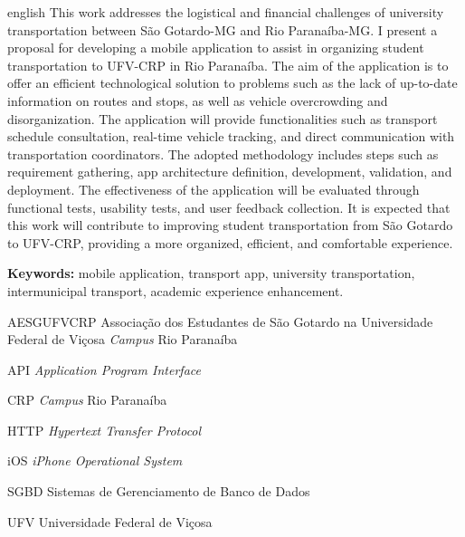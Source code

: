 \documentclass[
    12pt,                   %
    openright,              %
    oneside,                %
    a4paper,                %
    sumario=tradicional,    %
    english,                %
    brazil,                 %
    ]{abntex2}
\begin{document}
\begin{resumo}[Abstract]
\begin{otherlanguage*}{english}
   This work addresses the logistical and financial challenges of university transportation between São Gotardo-MG and Rio Paranaíba-MG. I present a proposal for developing a mobile application to assist in organizing student transportation to UFV-CRP in Rio Paranaíba. The aim of the application is to offer an efficient technological solution to problems such as the lack of up-to-date information on routes and stops, as well as vehicle overcrowding and disorganization. The application will provide functionalities such as transport schedule consultation, real-time vehicle tracking, and direct communication with transportation coordinators. The adopted methodology includes steps such as requirement gathering, app architecture definition, development, validation, and deployment. The effectiveness of the application will be evaluated through functional tests, usability tests, and user feedback collection. It is expected that this work will contribute to improving student transportation from São Gotardo to UFV-CRP, providing a more organized, efficient, and comfortable experience.
    
    \vspace{\onelineskip}
    
    \noindent\textbf{Keywords:} mobile application, transport app, university transportation, intermunicipal transport, academic experience enhancement.
 \end{otherlanguage*}
\end{resumo}

\listoffigures*
\cleardoublepage



\begin{siglas}
    \item[AESGUFVCRP] Associação dos Estudantes de São Gotardo na Universidade Federal de Viçosa \emph{Campus} Rio Paranaíba
    \item[API] \textit{Application Program Interface}
    \item[CRP] \emph{Campus} Rio Paranaíba
    \item[HTTP] \textit{Hypertext Transfer Protocol}
    \item[iOS] \textit{iPhone Operational System}
    \item[SGBD]Sistemas de Gerenciamento de Banco de Dados
    \item[UFV] Universidade Federal de Viçosa
    
    
\end{siglas}
\end{document}
